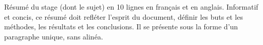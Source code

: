 Résumé du stage (dont le sujet) en 10 lignes en français et en anglais. Informatif et concis, ce résumé doit refléter l'esprit du document, définir les buts et les méthodes, les résultats et les conclusions. Il se présente sous la forme d'un paragraphe unique, sans alinéa.
